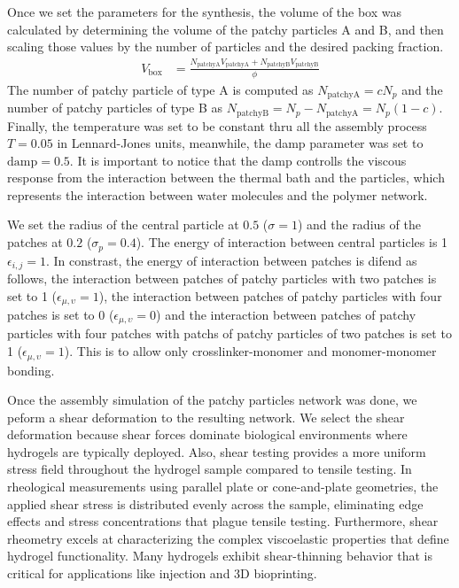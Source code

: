 Once we set the parameters for the synthesis, the volume of the box was calculated by determining the volume of the patchy particles A and B, and then scaling those values by the number of particles and the desired packing fraction.
\begin{align*}
    V_{\mathrm{box}} &= \frac{N_{\mathrm{patchyA}}V_{\mathrm{patchyA}}+N_{\mathrm{patchyB}}V_{\mathrm{patchyB}}}{\phi}
\end{align*}
The number of patchy particle of type A is computed as $N_{\mathrm{patchyA}} = c N_p$ and the number of patchy particles of type B as $N_{\mathrm{patchyB}}= N_p - N_{\mathrm{patchyA}}= N_p(1 - c )$.
Finally, the temperature was set to be constant thru all the assembly process $T=\num{0.05}$ in Lennard-Jones units, meanwhile, the damp parameter was set to $\mathrm{damp}=\num{0.5}$.
It is important to notice that the damp controlls the viscous response from the interaction between the thermal bath and the particles, which represents the interaction between water molecules and the polymer network.

We set the radius of the central particle at $0.5$ ($\sigma=1$) and the radius of the patches at $0.2$ ($\sigma_p=0.4$).
The energy of interaction between central particles is 1 $\epsilon_{i,j}=1$.
In constrast, the energy of interaction between patches is difend as follows,
the interaction between patches of patchy particles with two patches is set to 1 ($\epsilon_{\mu,\upsilon}=1$), 
the interaction between patches of patchy particles with four patches is set to \num{0} ($\epsilon_{\mu,\upsilon}=0$) 
and the interaction between patches of patchy particles with four patches with patchs of patchy particles of two patches is set to \num{1} ($\epsilon_{\mu,\upsilon}=1$).
This is to allow only crosslinker-monomer and monomer-monomer bonding.

Once the assembly simulation of the patchy particles network was done, we peform a shear deformation to the resulting network.
We select the shear deformation because shear forces dominate biological environments where hydrogels are typically deployed. 
Also, shear testing provides a more uniform stress field throughout the hydrogel sample compared to tensile testing. 
In rheological measurements using parallel plate or cone-and-plate geometries, the applied shear stress is distributed evenly across the sample, eliminating edge effects and stress concentrations that plague tensile testing.
Furthermore, shear rheometry excels at characterizing the complex viscoelastic properties that define hydrogel functionality.
Many hydrogels exhibit shear-thinning behavior that is critical for applications like injection and 3D bioprinting. 

